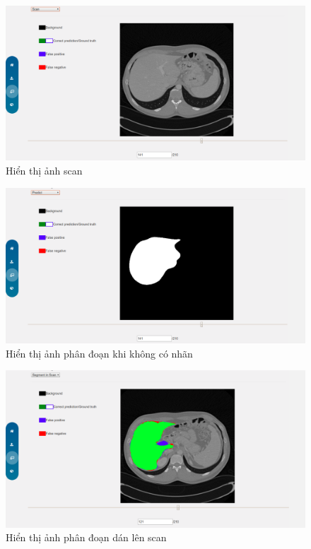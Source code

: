 \begin{figure}[h]
\centering
    \includegraphics[totalheight=7cm]{Images/app_scan.png}
    \caption{Hiển thị ảnh scan}
    \label{skip_conn}
\end{figure}
\begin{figure}[h]
\centering
    \includegraphics[totalheight=7cm]{Images/app_label.png}
    \caption{Hiển thị ảnh phân đoạn khi không có nhãn}
    \label{skip_conn}
\end{figure}
\begin{figure}[h]
\centering
    \includegraphics[totalheight=7cm]{Images/app_overlap_1.png}
    \caption{Hiển thị ảnh phân đoạn dán lên scan}
    \label{skip_conn}
\end{figure}
